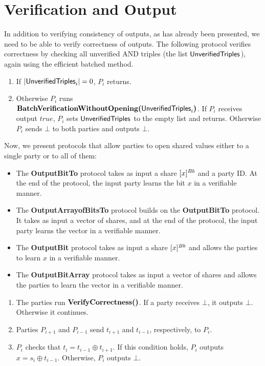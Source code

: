 \section{Verification and Output}

In addition to verifying consistency of outputs,
as has already been presented,
we need to be able to verify correctness of outputs.
The following protocol verifies correctness by checking all unverified AND triples (the list ${\sf UnverifiedTriples}_{}$), again using the efficient batched method.

\begin{protocol}
    \Verify 
    \begin{enumerate}
        \item If $\left|{\sf UnverifiedTriples}_{i}\right| = 0$, $P_i$ returns.
	\item Otherwise $P_i$ runs \\ $\textbf{BatchVerificationWithoutOpening(}{\sf UnverifiedTriples}_{i}\textbf{)}$.
		If $P_i$ receives output $true$,
		    $P_i$ sets ${\sf UnverifiedTriples}_{}$ to the empty list and returns.
		    Otherwise $P_i$ sends $\bot$ to both parties and outputs $\bot$.
    \end{enumerate}
\end{protocol}

\noindent Now, we present protocols that allow parties to open shared values either to a single party or to all of them:
\begin{itemize}
    \item The {\bf OutputBitTo} protocol takes as input a share $[x]^{Bb}$ and a party ID.
    At the end of the protocol, the input party learns the bit $x$ in a verifiable manner.
    \item The {\bf OutputArrayofBitsTo} protocol builds on the {\bf OutputBitTo} protocol.
    It takes as input a vector of shares, and at the end of the protocol, the input party learns the vector in a verifiable manner.
    \item The {\bf OutputBit} protocol takes as input a share $[x]^{Bb}$ and allows the parties to learn $x$ in a verifiable manner.
    \item The {\bf OutputBitArray} protocol takes as input a vector of shares and allows the parties to learn the vector in a verifiable manner.
\end{itemize}

\begin{protocol}
    \begin{enumerate}
        \item The parties run $\textbf{VerifyCorrectness()}$.
        If a party receives $\bot$, it outputs $\bot$. Otherwise it continues.
        \item Parties $P_{i + 1}$ and $P_{i - 1}$ send $t_{i + 1}$ and $t_{i - 1}$, respectively, to $P_i$.
	\item $P_i$ checks that $t_i = t_{i - 1} \oplus t_{i + 1}$.
        If this condition holds, $P_i$ outputs $x = s_i \oplus t_{i - 1}$.
        Otherwise, $P_i$ outputs $\bot$.
    \end{enumerate}
\end{protocol}

